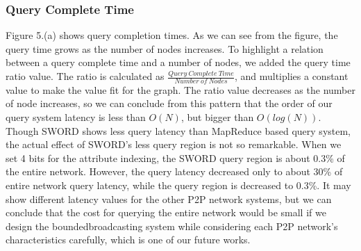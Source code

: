 \documentclass{acm_proc_article-sp}
\begin{document}
\subsubsection{Query Complete Time}
Figure 5.(a) shows query completion times. As we can see from the figure, the query time grows as the number of nodes increases. To highlight a relation between a query complete time and a number of nodes,
we added the query time ratio value. The ratio is calculated as \begin{math}\frac{Query\ Complete\ Time}{Number\ of\ Nodes}\end{math}, and multiplies a constant value to make the value fit for the graph.
The ratio value decreases as the number of node increases, so we can conclude from this pattern that the order of our query system latency is less than $O(N)$, but bigger than $O(log(N))$.
Though SWORD shows less query latency than MapReduce based query system, the actual effect of SWORD's less query region is not so remarkable. 
When we set 4 bits for the attribute indexing, the SWORD query region is about 0.3\% of the entire network. 
However, the query latency decreased only to about 30\% of entire network query latency, while the query region is decreased to 0.3\%.
It may show different latency values for the other P2P network systems, but we can conclude that the cost for querying the entire network would be small if we design the boundedbroadcasting system while considering
each P2P network's characteristics carefully, which is one of our future works.
\end{document}
